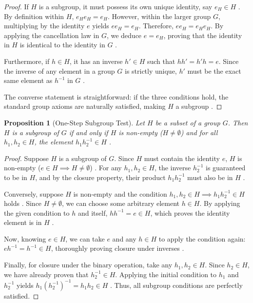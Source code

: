\documentclass[11pt]{article}
\theoremstyle{definition}
\theoremstyle{plain}
\newtheorem{proposition}{Proposition}[theorem]
\theoremstyle{remark}
\begin{document}
\begin{proof}
If $H$ is a subgroup, it must possess its own unique identity, say $e_H \in H$ \cite{fraleigh}. By definition within $H$, $e_H e_H = e_H$. However, within the larger group $G$, multiplying by the identity $e$ yields $e e_H = e_H$. Therefore, $e e_H = e_H e_H$. By applying the cancellation law in $G$, we deduce $e = e_H$, proving that the identity in $H$ is identical to the identity in $G$ \cite{fraleigh}. 

Furthermore, if $h \in H$, it has an inverse $h' \in H$ such that $h h' = h' h = e$. Since the inverse of any element in a group $G$ is strictly unique, $h'$ must be the exact same element as $h^{-1}$ in $G$ \cite{dummit}. 

The converse statement is straightforward: if the three conditions hold, the standard group axioms are naturally satisfied, making $H$ a subgroup \cite{gallian}.
\end{proof}

\begin{proposition}[One-Step Subgroup Test] \label{prop:onestep}
Let $H$ be a subset of a group $G$. Then $H$ is a subgroup of $G$ if and only if $H$ is non-empty ($H \neq \emptyset$) and for all $h_1, h_2 \in H$, the element $h_1 h_2^{-1} \in H$ \cite{dummit}.
\end{proposition}

\begin{proof}
Suppose $H$ is a subgroup of $G$. Since $H$ must contain the identity $e$, $H$ is non-empty ($e \in H \implies H \neq \emptyset$) \cite{gallian}. For any $h_1, h_2 \in H$, the inverse $h_2^{-1}$ is guaranteed to be in $H$, and by the closure property, their product $h_1 h_2^{-1}$ must also be in $H$ \cite{dummit}.

Conversely, suppose $H$ is non-empty and the condition $h_1, h_2 \in H \implies h_1 h_2^{-1} \in H$ holds \cite{dummit}. Since $H \neq \emptyset$, we can choose some arbitrary element $h \in H$. By applying the given condition to $h$ and itself, $h h^{-1} = e \in H$, which proves the identity element is in $H$ \cite{fraleigh}. 

Now, knowing $e \in H$, we can take $e$ and any $h \in H$ to apply the condition again: $e h^{-1} = h^{-1} \in H$, thoroughly proving closure under inverses \cite{fraleigh}. 

Finally, for closure under the binary operation, take any $h_1, h_2 \in H$. Since $h_2 \in H$, we have already proven that $h_2^{-1} \in H$. Applying the initial condition to $h_1$ and $h_2^{-1}$ yields $h_1 (h_2^{-1})^{-1} = h_1 h_2 \in H$ \cite{dummit}. Thus, all subgroup conditions are perfectly satisfied.
\end{proof}
\end{document}

